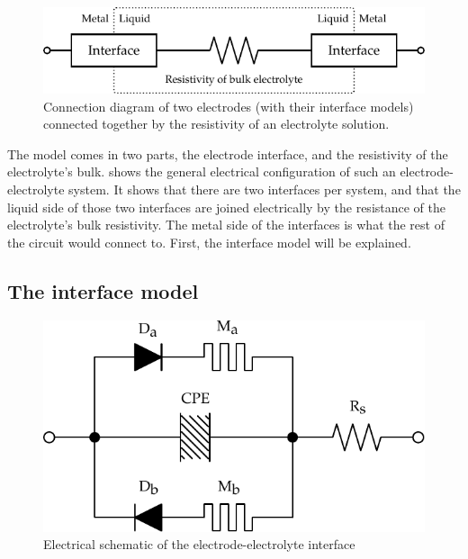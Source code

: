   \begin{figure}
    \centering
    \includegraphics{content/pt2/07-InterfaceModel/graphics/simpleElectrodeElectrolyteModel}
    \caption{\label{fig:pt2-simpleElectrodeElectrolyteModel}Connection diagram of two electrodes (with their interface models) connected together by the resistivity of an electrolyte solution.}
  \end{figure}
  The model comes in two parts, the electrode interface, and the resistivity of the electrolyte's bulk.
   shows the general electrical configuration of such an electrode-electrolyte system.
  It shows that there are two interfaces per system, and that the liquid side of those two interfaces are joined electrically by the resistance of the electrolyte's bulk resistivity.
  The metal side of the interfaces is what the rest of the circuit would connect to.
  First, the interface model will be explained.


  \subsection{The interface model}

    \begin{figure}
      \centering
      \includegraphics{content/pt2/07-InterfaceModel/graphics/interfaceSchematic}
      \caption{\label{fig:pt2-interfaceSchematic}Electrical schematic of the electrode-electrolyte interface}
    \end{figure}

